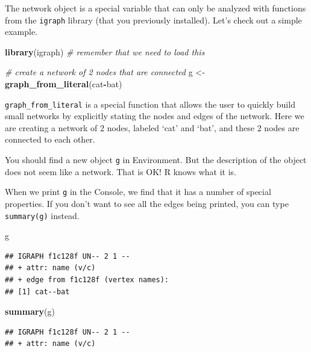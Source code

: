 \documentclass[
]{book}
\newenvironment{Shaded}{\begin{snugshade}}{\end{snugshade}}
\newcommand{\CommentTok}[1]{\textcolor[rgb]{0.56,0.35,0.01}{\textit{#1}}}
\newcommand{\FunctionTok}[1]{\textcolor[rgb]{0.13,0.29,0.53}{\textbf{#1}}}
\newcommand{\NormalTok}[1]{#1}
\newcommand{\OtherTok}[1]{\textcolor[rgb]{0.56,0.35,0.01}{#1}}
\newcommand{\SpecialCharTok}[1]{\textcolor[rgb]{0.81,0.36,0.00}{\textbf{#1}}}
\newcommand{\StringTok}[1]{\textcolor[rgb]{0.31,0.60,0.02}{#1}}
\begin{document}
The network object is a special variable that can only be analyzed with functions from the \texttt{igraph} library (that you previously installed).
Let's check out a simple example.

\begin{Shaded}
\begin{Highlighting}[]
\FunctionTok{library}\NormalTok{(igraph) }\CommentTok{\# remember that we need to load this}

\CommentTok{\# create a network of 2 nodes that are connected}
\NormalTok{g }\OtherTok{\textless{}{-}} \FunctionTok{graph\_from\_literal}\NormalTok{(}\StringTok{\textquotesingle{}cat\textquotesingle{}}\SpecialCharTok{{-}}\StringTok{\textquotesingle{}bat\textquotesingle{}}\NormalTok{)}
\end{Highlighting}
\end{Shaded}

\texttt{graph\_from\_literal} is a special function that allows the user to quickly build small networks by explicitly stating the nodes and edges of the network. Here we are creating a network of 2 nodes, labeled `cat' and `bat', and these 2 nodes are connected to each other.

You should find a new object \texttt{g} in Environment. But the description of the object does not seem like a network. That is OK! R knows what it is.

When we print \texttt{g} in the Console, we find that it has a number of special properties. If you don't want to see all the edges being printed, you can type \texttt{summary(g)} instead.

\begin{Shaded}
\begin{Highlighting}[]
\NormalTok{g}
\end{Highlighting}
\end{Shaded}

\begin{verbatim}
## IGRAPH f1c128f UN-- 2 1 -- 
## + attr: name (v/c)
## + edge from f1c128f (vertex names):
## [1] cat--bat
\end{verbatim}

\begin{Shaded}
\begin{Highlighting}[]
\FunctionTok{summary}\NormalTok{(g)}
\end{Highlighting}
\end{Shaded}

\begin{verbatim}
## IGRAPH f1c128f UN-- 2 1 -- 
## + attr: name (v/c)
\end{verbatim}
\end{document}
